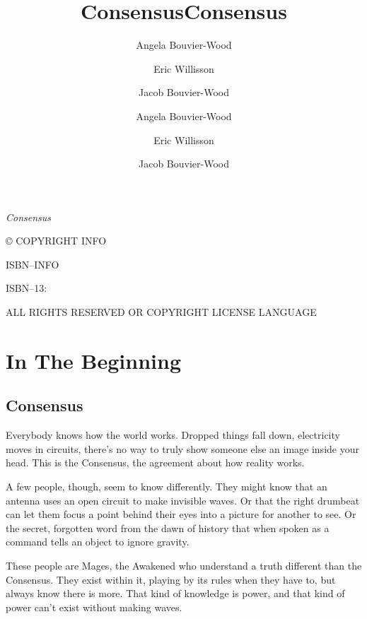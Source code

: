 \documentclass[10pt,twoside,openright]{memoir}
\title{Consensus}
\author{Angela Bouvier-Wood \and Eric Willisson \and Jacob Bouvier-Wood}
\date{} %
\author{Angela Bouvier-Wood \and Eric Willisson \and Jacob Bouvier-Wood}
\title{Consensus}
\date{}
\makeatletter
\def\maketitle{%
  \null
  \thispagestyle{empty}%
  \vfill
  \begin{center}\leavevmode
    \normalfont
    {\LARGE\raggedleft \@author\par}%
    \hrulefill\par
    {\huge\raggedright \@title\par}%
    \vskip 1cm
  \end{center}%
  \vfill
  \null
  \cleardoublepage
  }
\makeatother
\begin{document}
\let\cleardoublepage\clearpage


\maketitle






\frontmatter

\null\vfill

\begin{flushleft}
\textit{Consensus}


© COPYRIGHT INFO


ISBN--INFO

ISBN--13: 
\bigskip





ALL RIGHTS RESERVED OR COPYRIGHT LICENSE LANGUAGE




\end{flushleft}
\let\cleardoublepage\clearpage

\mainmatter

{
\tableofcontents
}

\hypertarget{in-the-beginning}{%
\chapter{In The Beginning}\label{in-the-beginning}}

\hypertarget{consensus}{%
\section{Consensus}\label{consensus}}

Everybody knows how the world works. Dropped things fall down,
electricity moves in circuits, there's no way to truly show someone else
an image inside your head. This is the Consensus, the agreement about
how reality works.

A few people, though, seem to know differently. They might know that an
antenna uses an open circuit to make invisible waves. Or that the right
drumbeat can let them focus a point behind their eyes into a picture for
another to see. Or the secret, forgotten word from the dawn of history
that when spoken as a command tells an object to ignore gravity.

These people are Mages, the Awakened who understand a truth different
than the Consensus. They exist within it, playing by its rules when they
have to, but always know there is more. That kind of knowledge is power,
and that kind of power can't exist without making waves.
\end{document}
